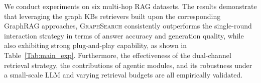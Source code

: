 We conduct experiments on six multi-hop RAG datasets. The results demonstrate that leveraging the graph KBs retrievers built upon the corresponding GraphRAG approaches, \textsc{GraphSearch} consistently outperforms the single-round interaction strategy in terms of answer accuracy and generation quality, while also exhibiting strong plug-and-play capability, as shown in Table~\ref{Tab:main_exp}. Furthermore, the effectiveness of the dual-channel retrieval strategy, the contributions of agentic modules, and its robustness under a small-scale LLM and varying retrieval budgets are all empirically validated.




